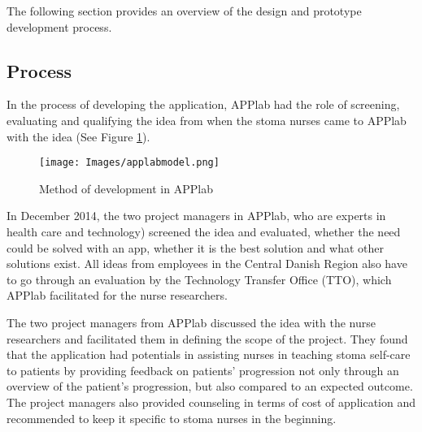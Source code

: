 The following section provides an overview of the design and prototype development process. 




\subsection{Process}
In the process of developing the application, APPlab had the role of screening, evaluating and qualifying the idea from when the stoma nurses came to APPlab with the idea (See Figure \ref{fig:applab}). 


\begin{figure}[!h] \centering
			\texttt{[image: Images/applabmodel.png]}
		\caption{Method of development in APPlab} \label{fig:applab}
\end{figure}

In December 2014, the two project managers in APPlab, who are experts in health care and technology) screened the idea and evaluated, whether the need could be solved with an app, whether it is the best solution and what other solutions exist. All ideas from employees in the Central Danish Region also have to go through an evaluation by the Technology Transfer Office (TTO), which APPlab facilitated for the nurse researchers. 

The two project managers from APPlab discussed the idea with the nurse researchers and facilitated them in defining the scope of the project. They found that the application had potentials in assisting nurses in teaching stoma self-care to patients by providing feedback on patients' progression not only through an overview of the patient's progression, but also compared to an expected outcome. The project managers also provided counseling in terms of cost of application and recommended to keep it specific to stoma nurses in the beginning. 



